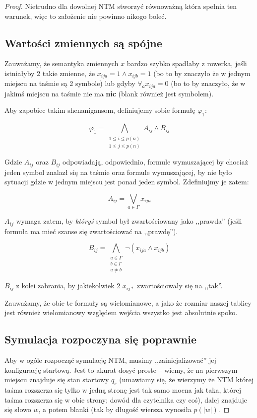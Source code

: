 \begin{proof}
    Nietrudno dla dowolnej NTM stworzyć równoważną która spełnia ten warunek, więc to założenie nie powinno nikogo boleć. 
    
    \subsection{Wartości zmiennych są spójne}
        Zauważamy, że semantyka zmiennych \(x\) bardzo szybko spadłaby z rowerka, jeśli istniałyby 2 takie zmienne, że \(x_{ija} = 1 \land x_{ijb} = 1\) (bo to by znaczyło że w jednym miejscu na taśmie są 2 symbole) lub gdyby \( \forall_a x_{ija} = 0\) (bo to by znaczyło, że w jakimś miejscu na taśmie nie ma \textbf{nic} (blank również jest symbolem).
    
        Aby zapobiec takim shenanigansom, definiujemy sobie formułę \(\varphi_1\): 
        
        \[ 
            \varphi_1 = \bigwedge_{\substack{1 \leq i \leq p(n) \\ 1 \leq j \leq p(n)}} A_{ij} \land B_{ij}  
        \]
        
        Gdzie \(A_{ij}\) oraz \(B_{ij}\) odpowiadają, odpowiednio, formule wymuszającej by chociaż jeden symbol znalazł się na taśmie oraz formule wymuszającej, by nie było sytuacji gdzie w jednym miejscu jest ponad jeden symbol. Zdefiniujmy je zatem:
        
        \[ 
            A_{ij} = \bigvee_{a \in \Gamma} x_{ija}
        \]
        
        \(A_{ij}\) wymaga zatem, by \textit{któryś} symbol był zwartościowany jako ,,prawda'' (jeśli formuła ma mieć szanse się zwartościować na ,,prawdę''). 
        
        \[
            B_{ij} = \bigwedge_{\substack{a\in\Gamma \\ b\in\Gamma \\ a \not = b}} \neg(x_{ija} \land x_{ijb})
        \]
    
        \(B_{ij}\) z kolei zabrania, by jakiekolwiek 2 \(x_{ij*}\) zwartościowały się na ,,tak''. 
        
        Zauważamy, że obie te formuły są wielomianowe, a jako że rozmiar naszej tablicy jest również wielomianowy względem wejścia wszystko jest absolutnie spoko. 
    
    \subsection{Symulacja rozpoczyna się poprawnie}
        Aby w ogóle rozpocząć symulację NTM, musimy ,,zainicjalizować'' jej konfigurację startową. Jest to akurat dosyć proste -- wiemy, że na pierwszym miejscu znajduje się stan startowy \(q_s\) (umawiamy się, że wierzymy że NTM której taśma rozszerza się tylko w jedną stronę jest tak samo mocna jak taka, której taśma rozszerza się w obie strony; dowód dla czytelnika czy coś), dalej znajduje się słowo \(w\), a potem blanki (tak by długość wiersza wynosiła \(p(|w|)\). 
        

\end{proof}
